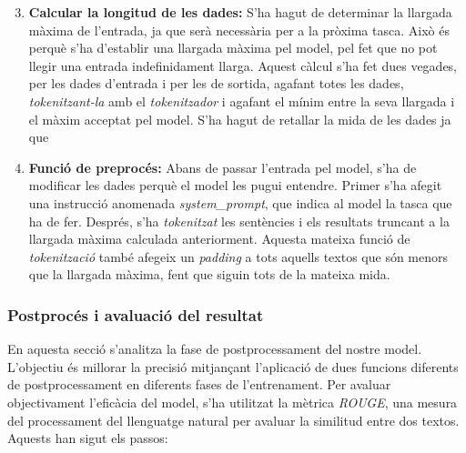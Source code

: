 \begin{enumerate}
    \setcounter{enumi}{2}
    \item \textbf{Calcular la longitud de les dades:} S'ha hagut de determinar la llargada màxima de l'entrada, ja que serà necessària per a la pròxima tasca. Això és perquè s'ha d'establir una llargada màxima pel model, pel fet que no pot llegir una entrada indefinidament llarga. Aquest càlcul s'ha fet dues vegades, per les dades d'entrada i per les de sortida, agafant totes les dades, \textit{tokenitzant-la} amb el \textit{tokenitzador} i agafant el mínim entre la seva llargada i el màxim acceptat pel model. S'ha hagut de retallar la mida de les dades ja que 
    \item \textbf{Funció de preprocés:} Abans de passar l'entrada pel model, s'ha de modificar les dades perquè el model les pugui entendre. Primer s'ha afegit una instrucció anomenada \textit{system\_prompt}, que indica al model la tasca que ha de fer. Després, s'ha \textit{tokenitzat} les sentències i els resultats truncant a la llargada màxima calculada anteriorment. Aquesta mateixa funció de \textit{tokenització} també afegeix un \textit{padding} a tots aquells textos que són menors que la llargada màxima, fent que siguin tots de la mateixa mida.
\end{enumerate}


\subsubsection{Postprocés i avaluació del resultat}
En aquesta secció s'analitza la fase de postprocessament del nostre model. L'objectiu és millorar la precisió mitjançant l'aplicació de dues funcions diferents de postprocessament en diferents fases de l'entrenament. Per avaluar objectivament l'eficàcia del model, s'ha utilitzat la mètrica \textit{ROUGE}, una mesura del processament del llenguatge natural per avaluar la similitud entre dos textos. Aquests han sigut els passos:

